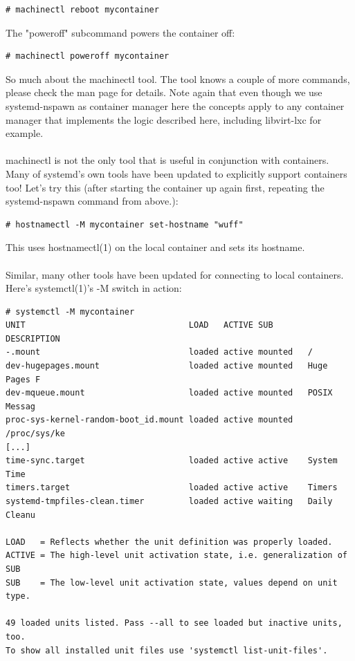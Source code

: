 \documentclass[titlepage]{article}
\begin{document}
\begin{lstlisting}
# machinectl reboot mycontainer
\end{lstlisting}
The "poweroff" subcommand powers the container off:
\begin{lstlisting}
# machinectl poweroff mycontainer
\end{lstlisting}
So much about the machinectl tool. The tool knows a couple of more commands, please check the man page for details. Note again that even though we use systemd-nspawn as container manager here the concepts apply to any container manager that implements the logic described here, including libvirt-lxc for example.
\\
\\
machinectl is not the only tool that is useful in conjunction with containers. Many of systemd's own tools have been updated to explicitly support containers too! Let's try this (after starting the container up again first, repeating the systemd-nspawn command from above.):
\begin{lstlisting}
# hostnamectl -M mycontainer set-hostname "wuff"
\end{lstlisting}
This uses hostnamectl(1) on the local container and sets its hostname.
\\
\\
Similar, many other tools have been updated for connecting to local containers. Here's systemctl(1)'s -M switch in action:
\begin{lstlisting}
# systemctl -M mycontainer
UNIT                                 LOAD   ACTIVE SUB       DESCRIPTION 
-.mount                              loaded active mounted   /
dev-hugepages.mount                  loaded active mounted   Huge Pages F
dev-mqueue.mount                     loaded active mounted   POSIX Messag
proc-sys-kernel-random-boot_id.mount loaded active mounted   /proc/sys/ke
[...]
time-sync.target                     loaded active active    System Time 
timers.target                        loaded active active    Timers
systemd-tmpfiles-clean.timer         loaded active waiting   Daily Cleanu

LOAD   = Reflects whether the unit definition was properly loaded.
ACTIVE = The high-level unit activation state, i.e. generalization of SUB
SUB    = The low-level unit activation state, values depend on unit type.

49 loaded units listed. Pass --all to see loaded but inactive units, too.
To show all installed unit files use 'systemctl list-unit-files'.
\end{lstlisting}
\end{document}
